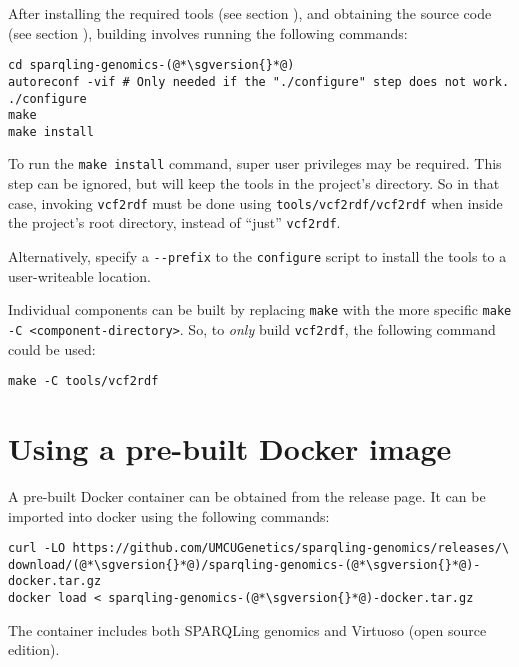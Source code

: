   After installing the required tools (see section ),
  and obtaining the source code (see section ),
  building involves running the following commands:

\begin{siderules}
\begin{lstlisting}
cd sparqling-genomics-(@*\sgversion{}*@)
autoreconf -vif # Only needed if the "./configure" step does not work.
./configure
make
make install
\end{lstlisting}
\end{siderules}

  To run the \texttt{make install} command, super user privileges may be
  required.  This step can be ignored, but will keep the tools in the project's
  directory.  So in that case, invoking \texttt{vcf2rdf} must be done using
  \texttt{tools/vcf2rdf/vcf2rdf} when inside the project's root directory,
  instead of ``just'' \texttt{vcf2rdf}.

  Alternatively, specify a \texttt{-{}-prefix} to the \texttt{configure}
  script to install the tools to a user-writeable location.

  Individual components can be built by replacing \texttt{make} with the
  more specific \texttt{make -C <component-directory>}.  So, to \emph{only}
  build \texttt{vcf2rdf}, the following command could be used:

\begin{siderules}
\begin{verbatim}
make -C tools/vcf2rdf
\end{verbatim}
\end{siderules}

\section{Using a pre-built Docker image}

  A pre-built Docker container can be obtained from the release page.  It
  can be imported into docker using the following commands:

\begin{siderules}
\begin{lstlisting}
curl -LO https://github.com/UMCUGenetics/sparqling-genomics/releases/\
download/(@*\sgversion{}*@)/sparqling-genomics-(@*\sgversion{}*@)-docker.tar.gz
docker load < sparqling-genomics-(@*\sgversion{}*@)-docker.tar.gz
\end{lstlisting}
\end{siderules}

  The container includes both SPARQLing genomics and Virtuoso (open source
  edition).
